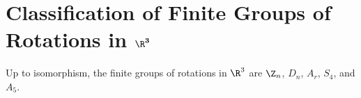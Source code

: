 \section{Classification of Finite Groups of Rotations in $\mathbf{\R^3}$}

\begin{theorem}
	Up to isomorphism, the finite groups of rotations in $\R^3$ are $\Z_n$, $D_n$, $A_r$, $S_4$, and $A_5$.
\end{theorem}
